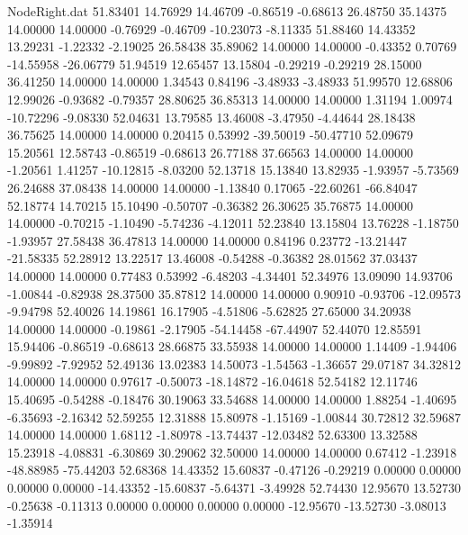 \begin{filecontents}{NodeRight.dat}
  51.83401   14.76929   14.46709    -0.86519   -0.68613   26.48750   35.14375   14.00000   14.00000   -0.76929   -0.46709  -10.23073   -8.11335
  51.88460   14.43352   13.29231    -1.22332   -2.19025   26.58438   35.89062   14.00000   14.00000   -0.43352    0.70769  -14.55958  -26.06779
  51.94519   12.65457   13.15804    -0.29219   -0.29219   28.15000   36.41250   14.00000   14.00000    1.34543    0.84196   -3.48933   -3.48933
  51.99570   12.68806   12.99026    -0.93682   -0.79357   28.80625   36.85313   14.00000   14.00000    1.31194    1.00974  -10.72296   -9.08330
  52.04631   13.79585   13.46008    -3.47950   -4.44644   28.18438   36.75625   14.00000   14.00000    0.20415    0.53992  -39.50019  -50.47710
  52.09679   15.20561   12.58743    -0.86519   -0.68613   26.77188   37.66563   14.00000   14.00000   -1.20561    1.41257  -10.12815   -8.03200
  52.13718   15.13840   13.82935    -1.93957   -5.73569   26.24688   37.08438   14.00000   14.00000   -1.13840    0.17065  -22.60261  -66.84047
  52.18774   14.70215   15.10490    -0.50707   -0.36382   26.30625   35.76875   14.00000   14.00000   -0.70215   -1.10490   -5.74236   -4.12011
  52.23840   13.15804   13.76228    -1.18750   -1.93957   27.58438   36.47813   14.00000   14.00000    0.84196    0.23772  -13.21447  -21.58335
  52.28912   13.22517   13.46008    -0.54288   -0.36382   28.01562   37.03437   14.00000   14.00000    0.77483    0.53992   -6.48203   -4.34401
  52.34976   13.09090   14.93706    -1.00844   -0.82938   28.37500   35.87812   14.00000   14.00000    0.90910   -0.93706  -12.09573   -9.94798
  52.40026   14.19861   16.17905    -4.51806   -5.62825   27.65000   34.20938   14.00000   14.00000   -0.19861   -2.17905  -54.14458  -67.44907
  52.44070   12.85591   15.94406    -0.86519   -0.68613   28.66875   33.55938   14.00000   14.00000    1.14409   -1.94406   -9.99892   -7.92952
  52.49136   13.02383   14.50073    -1.54563   -1.36657   29.07187   34.32812   14.00000   14.00000    0.97617   -0.50073  -18.14872  -16.04618
  52.54182   12.11746   15.40695    -0.54288   -0.18476   30.19063   33.54688   14.00000   14.00000    1.88254   -1.40695   -6.35693   -2.16342
  52.59255   12.31888   15.80978    -1.15169   -1.00844   30.72812   32.59687   14.00000   14.00000    1.68112   -1.80978  -13.74437  -12.03482
  52.63300   13.32588   15.23918    -4.08831   -6.30869   30.29062   32.50000   14.00000   14.00000    0.67412   -1.23918  -48.88985  -75.44203
  52.68368   14.43352   15.60837    -0.47126   -0.29219    0.00000    0.00000    0.00000    0.00000  -14.43352  -15.60837   -5.64371   -3.49928
  52.74430   12.95670   13.52730    -0.25638   -0.11313    0.00000    0.00000    0.00000    0.00000  -12.95670  -13.52730   -3.08013   -1.35914

\end{filecontents}
